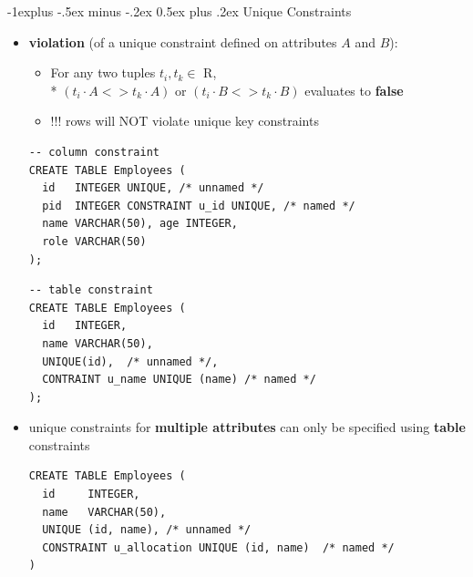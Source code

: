 \documentclass[10pt, landscape]{article}
\makeatletter
\renewcommand{\subsection}{\@startsection{subsection}{2}{0mm}%
  {-1explus -.5ex minus -.2ex}%
  {0.5ex plus .2ex}%
{\normalfont\normalsize\bfseries}}
\makeatother
\begin{document}
\begin{multicols}{3}
  \subsection{Unique Constraints}
  \begin{itemize}
    \item \textbf{violation} (of a unique constraint defined on attributes $A$ and $B$):
      \begin{itemize}
        \item For any two tuples $t_i, t_k \in$ R, \\*
          $(t_i\cdot A <> t_k\cdot A)$ or  $(t_i\cdot B <> t_k \cdot B)$ evaluates to  \textbf{false}
        \item  !!!  rows will NOT violate unique key constraints
      \end{itemize}
      \begin{lstlisting}[style=mySQL]
-- column constraint
CREATE TABLE Employees (
  id   INTEGER UNIQUE, /* unnamed */
  pid  INTEGER CONSTRAINT u_id UNIQUE, /* named */
  name VARCHAR(50), age INTEGER,
  role VARCHAR(50)
);
      \end{lstlisting}
      \begin{lstlisting}[style=mySQL]
-- table constraint
CREATE TABLE Employees (
  id   INTEGER,
  name VARCHAR(50), 
  UNIQUE(id),  /* unnamed */,
  CONTRAINT u_name UNIQUE (name) /* named */
);
      \end{lstlisting}
    \item unique constraints for \textbf{multiple attributes} can only be specified using \textbf{table} constraints
      \begin{lstlisting}[style=mySQL]
CREATE TABLE Employees (
  id     INTEGER,
  name   VARCHAR(50),
  UNIQUE (id, name), /* unnamed */
  CONSTRAINT u_allocation UNIQUE (id, name)  /* named */
)
      \end{lstlisting}
  \end{itemize}


\end{multicols}
\end{document}
